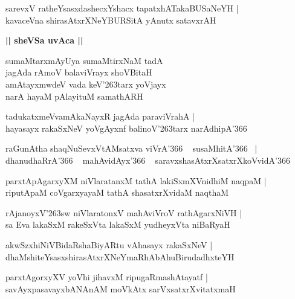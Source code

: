 \documentclass[twoside,12pt,openright]{book}
\def\S{\char'263}
\newcounter{shloka}[chapter]
\def\uvaca#1{\centerline{{\large\textbf{#1}}}}
\begin{document}
\begin{shloka}%
sarevxV ratheYsasxdashecxYshacx tapatxhATakaBUSaNeYH |\\
kavaceVna shirasAtxrXNeYBURSitA yAnutx satavxrAH
\end{shloka}

\uvaca{|| sheVSa uvAca ||}

\begin{shloka}%
sumaMtarxmAyUya sumaMtirxNaM tadA \\
jagAda rAmoV balaviVrayx shoVBitaH \\
amAtayxmwdeV vada keV\S tarx yoVjayx\\
narA hayaM pAlayituM samathARH 
\end{shloka}

\begin{shloka}%
tadukatxmeVvamAkaNayxR jagAda paraviVrahA |\\
hayasayx rakaSxNeV yoVgAyxnf balinoV\S tarx narAdhipA\char'366 
\end{shloka}

\begin{shloka}%
raGunAtha shaqNuSevxVtAMsatxva viVrA\char'366 ~ susaMhitA\char'366 ~|\\
dhanudhaRrA\char'366 ~ mahAvidAyx\char'366 ~ saravxshasAtxrXsatxrXkoVvidA\char'366
\end{shloka}

\begin{shloka}%
parxtApAgarxyXM niVlaratanxM tathA lakiSxmXVnidhiM naqpaM |\\
riputApaM coVgarxyayaM tathA shasatxrXvidaM naqthaM 
\end{shloka}

\begin{shloka}%
rAjanoyxV\S sw  niVlaratonxV mahAviVroV rathAgarxNiVH |\\
sa Eva lakaSxM rakeSxVta lakaSxM yudheyxVta niBaRyaH
\end{shloka}

\begin{shloka}%
akwSzxhiNiVBidaRshaBiyARtu vAhasayx rakaSxNeV |\\
dhaMshiteYsasxshirasAtxrXNeYmaRhAbAhuBirudadhxteYH
\end{shloka}

\begin{shloka}%
parxtAgorxyXV  yoVhi jihavxM ripugaRmashAtayatf |\\
savAyxpasavayxbANAnAM moVkAtx sarVxsatxrXvitatxmaH  
\end{shloka}
\end{document}
